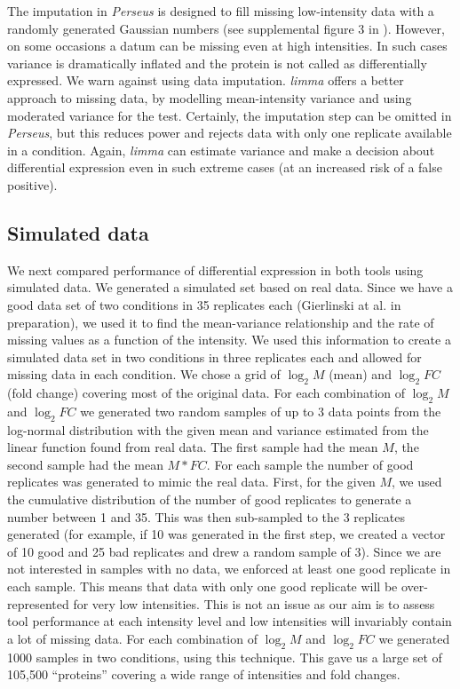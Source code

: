 \documentclass[]{article}
\begin{document}
The imputation in \emph{Perseus} is designed to fill missing
low-intensity data with a randomly generated Gaussian numbers (see
supplemental figure 3 in \citet{tyanova2016}). However, on some
occasions a datum can be missing even at high intensities. In such cases
variance is dramatically inflated and the protein is not called as
differentially expressed. We warn against using data imputation.
\emph{limma} offers a better approach to missing data, by modelling
mean-intensity variance and using moderated variance for the test.
Certainly, the imputation step can be omitted in \emph{Perseus}, but
this reduces power and rejects data with only one replicate available in
a condition. Again, \emph{limma} can estimate variance and make a
decision about differential expression even in such extreme cases (at an
increased risk of a false positive).

\subsection{Simulated data}\label{simulated-data}

We next compared performance of differential expression in both tools
using simulated data. We generated a simulated set based on real data.
Since we have a good data set of two conditions in 35 replicates each
(Gierlinski at al. in preparation), we used it to find the mean-variance
relationship and the rate of missing values as a function of the
intensity. We used this information to create a simulated data set in
two conditions in three replicates each and allowed for missing data in
each condition. We chose a grid of \(\log_2 M\) (mean) and \(\log_2 FC\)
(fold change) covering most of the original data. For each combination
of \(\log_2 M\) and \(\log_2 FC\) we generated two random samples of up
to 3 data points from the log-normal distribution with the given mean
and variance estimated from the linear function found from real data.
The first sample had the mean \(M\), the second sample had the mean
\(M * FC\). For each sample the number of good replicates was generated
to mimic the real data. First, for the given \(M\), we used the
cumulative distribution of the number of good replicates to generate a
number between 1 and 35. This was then sub-sampled to the 3 replicates
generated (for example, if 10 was generated in the first step, we
created a vector of 10 good and 25 bad replicates and drew a random
sample of 3). Since we are not interested in samples with no data, we
enforced at least one good replicate in each sample. This means that
data with only one good replicate will be over-represented for very low
intensities. This is not an issue as our aim is to assess tool
performance at each intensity level and low intensities will invariably
contain a lot of missing data. For each combination of \(\log_2 M\) and
\(\log_2 FC\) we generated 1000 samples in two conditions, using this
technique. This gave us a large set of 105,500 ``proteins'' covering a
wide range of intensities and fold changes.
\end{document}
